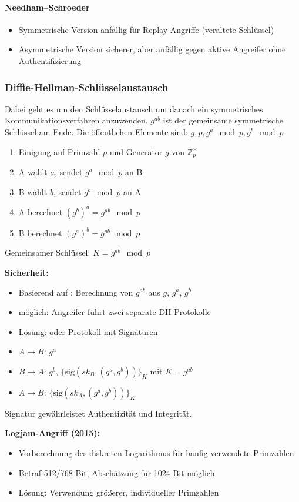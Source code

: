 \documentclass[
../../css_summary.tex,
]
{subfiles}
\begin{document}
\paragraph{Needham–Schroeder}
\begin{itemize}
   \item Symmetrische Version anfällig für Replay-Angriffe (veraltete Schlüssel)
   \item Asymmetrische Version sicherer, aber anfällig gegen aktive Angreifer ohne Authentifizierung
\end{itemize}

\subsubsection{Diffie-Hellman-Schlüsselaustausch}

\begin{defbox}
   Dabei geht es um den Schlüsselaustausch um danach ein symmetrisches Kommunikationsverfahren anzuwenden. $g^{ab}$ ist der gemeinsame symmetrische Schlüssel am Ende. Die öffentlichen Elemente sind: $g, p , g^a\mod p , g^b\mod p$
   \begin{enumerate}
      \item Einigung auf Primzahl $p$ und Generator $g$ von $\mathbb{Z}_p^\times$
      \item A wählt $a$, sendet $g^a \mod p$ an B
      \item B wählt $b$, sendet $g^b \mod p$ an A
      \item A berechnet $(g^b)^a = g^{ab} \mod p$
      \item B berechnet $(g^a)^b = g^{ab} \mod p$
   \end{enumerate}
   Gemeinsamer Schlüssel: $K = g^{ab} \mod p$
\end{defbox}

\noindent\textbf{Sicherheit:}
\begin{itemize}
   \item Basierend auf : Berechnung von $g^{ab}$ aus $g$, $g^a$, $g^b$
   \item {} möglich: Angreifer führt zwei separate DH-Protokolle
   \item Lösung:  oder  Protokoll mit Signaturen
\end{itemize}

\begin{defbox}
   \begin{itemize}
      \item $A \rightarrow B$: $g^a$
      \item $B \rightarrow A$: $g^b$, $\{\text{sig}(sk_B, (g^a, g^b))\}_K$ mit $K = g^{ab}$
      \item $A \rightarrow B$: $\{\text{sig}(sk_A, (g^a, g^b))\}_K$
   \end{itemize}
   Signatur gewährleistet Authentizität und Integrität.
\end{defbox}

\noindent\textbf{Logjam-Angriff (2015):}
\begin{itemize}
   \item Vorberechnung des diskreten Logarithmus für häufig verwendete Primzahlen
   \item Betraf 512/768 Bit, Abschätzung für 1024 Bit möglich
   \item Lösung: Verwendung größerer, individueller Primzahlen
\end{itemize}
\end{document}
